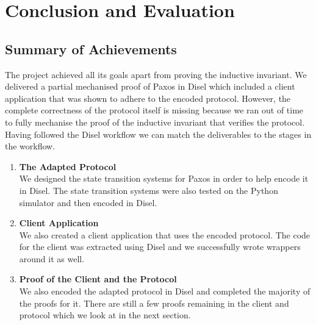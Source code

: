 \chapter{Conclusion and Evaluation}

\section{Summary of Achievements}
The project achieved all its goals apart from proving the inductive invariant.
We delivered a partial mechanised proof of Paxos in Disel
which included a client application that was shown to adhere to the encoded
protocol. However, the complete correctness of the protocol itself is missing
because we ran out of time to fully mechanise the proof of the inductive
invariant that verifies the protocol. Having followed the Disel workflow we can
match the deliverables to the stages in the workflow.

\begin{enumerate}
  \item \textbf{The Adapted Protocol} \\
    We designed the state transition systems for Paxos in order to help encode it in
    Disel. The state transition systems were also tested on the Python simulator
    and then encoded in Disel.
  \item \textbf{Client Application} \\
    We also created a client application that uses the encoded protocol. The
    code for the client was extracted using Disel and we successfully wrote
    wrappers around it as well.
  \item \textbf{Proof of the Client and the Protocol} \\
    We also encoded the adapted protocol in Disel and completed the majority
    of the proofs for it. There are still a few proofs remaining in the
    client and protocol which we look at in the next section.
\end{enumerate}

